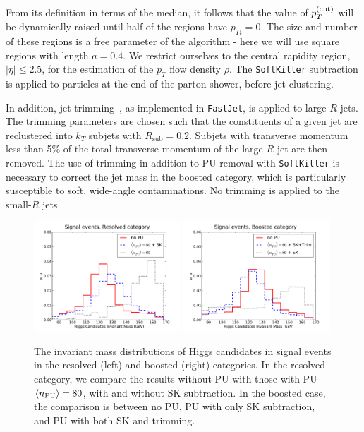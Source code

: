 From its definition in terms of the median,
it follows that the value of $p_T^{(\rm cut)}$
will be dynamically raised until half of the regions have
$p_{Ti}=0$.
%
The size and number of these regions is a free parameter of the algorithm -
here we will use square regions with length $a=0.4$.
%
We restrict ourselves to the central rapidity region,
$|\eta| \le 2.5$, for the estimation of the
$p_T$ flow density $\rho$.
%
The {\tt SoftKiller} subtraction is applied to particles at the end of the parton shower, before
jet clustering.

In addition, jet trimming~\cite{Krohn:2009th}, as implemented in {\tt FastJet}, is applied to large-$R$ jets.
%
The trimming parameters are chosen such that the constituents of a given jet are reclustered into $k_T$ subjets with $R_{\textrm{sub}} = 0.2$.
Subjets with transverse momentum less than 5\% of the total
transverse momentum of the large-$R$ jet are then removed.
%
The use of trimming in addition to PU removal with {\tt SoftKiller} is necessary to correct the jet mass in the boosted category,
which is particularly susceptible
to soft, wide-angle contaminations.
%
No trimming is applied to the small-$R$ jets.


\begin{figure}[t]
  \begin{center}
    \includegraphics[width=0.49\textwidth]{plots/m_htot_res_signal_PUnoSK.pdf}
    \includegraphics[width=0.49\textwidth]{plots/m_htot_bst_signal_PUnoTrim.pdf}
    \caption{\small
    The invariant mass distributions of Higgs candidates in signal
    events in the resolved (left) and boosted
    (right) categories.
    In the resolved category,
    we compare  the results without PU
    with those with PU $\left\langle n_{\rm PU}\right\rangle=80$,
    with and without SK subtraction.
    In the boosted case, the comparison is between no PU,
    PU with only SK subtraction,
    and PU with both SK and trimming.
}
\label{fig:PUvalidation}
\end{center}
\end{figure}

